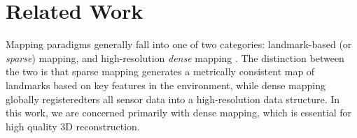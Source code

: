 \documentclass[10pt,twocolumn,letterpaper]{article}
\begin{document}
\section{Related Work}
Mapping paradigms generally fall into one of two categories:
landmark-based (or \emph{sparse}) mapping, and high-resolution \emph{dense}
mapping \cite{FastSlam} . The distinction between the two is that sparse mapping
generates a metrically consistent map of landmarks based on key features in the
environment, while dense mapping globally registeredters all sensor data into a
high-resolution data structure. In this work, we are concerned primarily with
dense mapping, which is essential for high quality 3D reconstruction.
\end{document}
